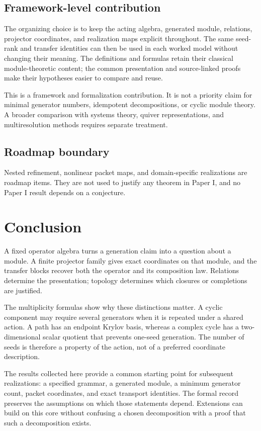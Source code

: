 \documentclass[11pt]{article}
\theoremstyle{definition}
\theoremstyle{remark}
\begin{document}
\subsection{Framework-level contribution}

The organizing choice is to keep the acting algebra, generated module,
relations, projector coordinates, and realization maps explicit throughout.
The same seed-rank and transfer identities can then be used in each worked
model without changing their meaning. The definitions and formulas retain
their classical module-theoretic content; the common presentation and
source-linked proofs make their hypotheses easier to compare and reuse.

This is a framework and formalization contribution. It is not a priority
claim for minimal generator numbers, idempotent decompositions, or cyclic
module theory. A broader comparison with systems theory, quiver
representations, and multiresolution methods requires separate treatment.

\subsection{Roadmap boundary}

Nested refinement, nonlinear packet maps, and domain-specific realizations are roadmap items. They are not used to justify any theorem in Paper I, and no Paper I result depends on a conjecture.

\section{Conclusion}

A fixed operator algebra turns a generation claim into a question about a
module. A finite projector family gives exact coordinates on that module,
and the transfer blocks recover both the operator and its composition law.
Relations determine the presentation; topology determines which closures
or completions are justified.

The multiplicity formulas show why these distinctions matter. A cyclic
component may require several generators when it is repeated under a shared
action. A path has an endpoint Krylov basis, whereas a complex cycle has a
two-dimensional scalar quotient that prevents one-seed generation. The
number of seeds is therefore a property of the action, not of a preferred
coordinate description.

The results collected here provide a common starting point for subsequent
realizations: a specified grammar, a generated module, a minimum generator
count, packet coordinates, and exact transport identities. The formal record
preserves the assumptions on which those statements depend. Extensions can
build on this core without confusing a chosen decomposition with a proof
that such a decomposition exists.
\end{document}
